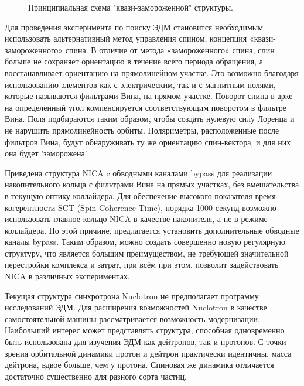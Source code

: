 \begin{figure}[ht]
    \caption{Принципиальная схема "квази-замороженной" структуры.}\label{fig:QFS}
\end{figure}

\par Для проведения эксперимента по поиску ЭДМ становится необходимым использовать альтернативный метод управления спином, концепция «квази-замороженного» спина. В отличие от метода «замороженного» спина, спин больше не сохраняет ориентацию в течение всего периода обращения, а восстанавливает ориентацию на прямолинейном участке. Это возможно благодаря использованию элементов как с электрическим, так и с магнитным полями, которые называются фильтрами Вина, на прямом участке. Поворот спина в арке на определенный угол компенсируется соответствующим поворотом в фильтре Вина. Поля подбираются таким образом, чтобы создать нулевую силу Лоренца и не нарушить прямолинейность орбиты. Поляриметры, расположенные после фильтров Вина, будут обнаруживать ту же ориентацию спин-вектора, и для них она будет 'заморожена'.

\par Приведена структура NICA c обводными каналами bypass для реализации накопительного кольца с фильтрами Вина на прямых участках, без вмешательства в текущую оптику коллайдера. Для обеспечение высокого показателя время когерентности SCT (Spin Coherence Time), порядка 1000 секунд возможно использовать главное кольцо NICA в качестве накопителя, а не в режиме коллайдера. По этой причине, предлагается установить дополнительные обводные каналы bypass. Таким образом, можно создать совершенно новую регулярную структуру, что является большим преимуществом, не требующей значительной перестройки комплекса и затрат, при всём при этом, позволит задействовать NICA в различных экспериментах.

\par Текущая структура синхротрона Nuclotron не предполагает программу исследований ЭДМ. Для расширения возможностей Nuclotron в качестве самостоятельной машины рассматривается возможность модернизации. Наибольший интерес может представлять структура, способная одновременно быть использована для изучения ЭДМ как дейтронов, так и протонов. С точки зрения орбитальной динамики протон и дейтрон практически идентичны, масса дейтрона, вдвое больше, чем у протона. Спиновая же динамика отличается достаточно существенно для разного сорта частиц. 

